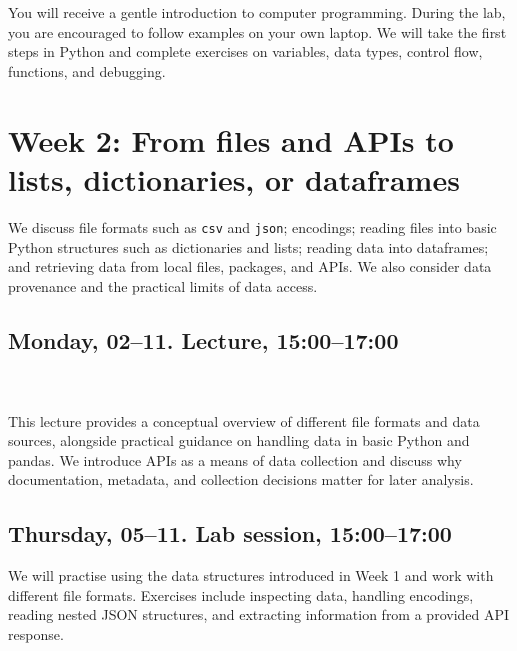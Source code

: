 \\
\\

You will receive a gentle introduction to computer programming. During the lab, you are encouraged to follow examples on your own laptop. We will take the first steps in Python and complete exercises on variables, data types, control flow, functions, and debugging.


\section*{Week 2: From files and APIs to lists, dictionaries, or dataframes}

We discuss file formats such as \texttt{csv} and \texttt{json}; encodings; reading files into basic Python structures such as dictionaries and lists; reading data into dataframes; and retrieving data from local files, packages, and APIs. We also consider data provenance and the practical limits of data access.

\subsection*{Monday, 02--11. Lecture, 15:00--17:00}

\\
\\

This lecture provides a conceptual overview of different file formats and data sources, alongside practical guidance on handling data in basic Python and pandas. We introduce APIs as a means of data collection and discuss why documentation, metadata, and collection decisions matter for later analysis.

\subsection*{Thursday, 05--11. Lab session, 15:00--17:00}

We will practise using the data structures introduced in Week 1 and work with different file formats. Exercises include inspecting data, handling encodings, reading nested JSON structures, and extracting information from a provided API response.

